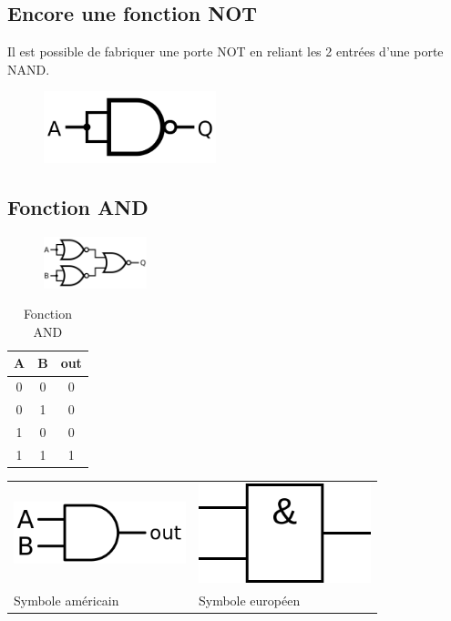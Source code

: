 \documentclass[a4paper,11pt]{article}
\begin{document}
\begin{Form}
\subsection{Encore une fonction NOT}
Il est possible de fabriquer une porte NOT en reliant les 2 entrées d'une porte NAND.
\begin{figure}[!h]
\centering
\includegraphics[width=5cm]{ressources/not-from-nand.png}
\label{not2}
\end{figure}
\subsection{Fonction AND}
\begin{figure}[!h]
\centering
\includegraphics[width=3cm]{ressources/and-from-nor.png}
\label{and}
\end{figure}
\begin{table}[!h]
\begin{center}
\begin{tabular}{|c|c|c|}
\hline 
A & B & out \\ 
\hline 
0 & 0 & 0 \\ 
\hline 
0 & 1 & 0\\ 
\hline 
1 & 0 & 0\\
\hline 
1 & 1 & 1\\
\hline 
\end{tabular}
\caption{\label{not}Fonction AND}
\end{center}
\end{table} 
\begin{center}
\begin{tabular}{*{2}{>{\centering\arraybackslash}m{}}}
\includegraphics[width=5cm]{ressources/and-us.png}
  & 
\includegraphics[width=5cm]{ressources/and-eu.png}  
   \\
Symbole américain & Symbole européen
\end{tabular}
\end{center}

\end{Form}
\end{document}

